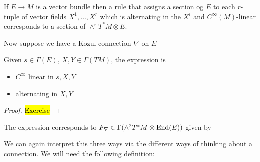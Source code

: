 \documentclass{article}
\begin{document}
\begin{lemma}
	If $E\to M$ is a vector bundle then a rule that assigns a section og $E$ to each $r$-tuple of vector fields $X^1, \dots, X^r$ which is alternating in the $X^i$ and $C^\infty(M)$-linear corresponds to a section of $\wedge^r T^\ast M \otimes E$. 
\end{lemma}

Now suppose we have a Kozul connection $\nabla$ on $E$

\begin{lemma}
	Given $s \in \Gamma(E), \, X,Y \in \Gamma(TM)$, the expression 
is 
\begin{itemize}
	\item $C^\infty$ linear in $s,X,Y$ 
	\item alternating in $X,Y$
\end{itemize}
\end{lemma}
\begin{proof}
	\hl{Exercise}
\end{proof}

\begin{corollary}
	The expression corresponds to $F_\nabla \in \Gamma(\wedge^2 T^\ast M \otimes \operatorname{End}(E))$ given by 
\end{corollary}

We can again interpret this three ways via the different ways of thinking about a connection. We will need the following definition:
\end{document}
